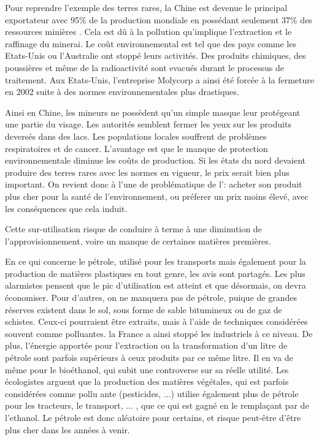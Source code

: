 Pour reprendre l'exemple des terres rares, la Chine est devenue le principal exportateur avec 95\% de la production mondiale en possédant seulement 37\% des ressources minières \cite{MongolieChine}. Cela est dû à la pollution qu'implique l'extraction et le raffinage du minerai. Le coût environnemental est tel que des pays comme les Etats-Unis ou l'Australie ont stoppé leurs activités. Des produits chimiques, des poussières et même de la radioactivité sont evacués durant le processus de traitement. Aux Etats-Unis, l'entreprise Molycorp a ainsi été forcée à la fermeture en 2002 suite à des normes environnementales plus drastiques.

Ainsi en Chine, les mineurs ne possèdent qu'un simple masque leur protégeant une partie du visage. Les autorités semblent fermer les yeux sur les produits deversés dans des lacs. Les populations locales souffrent de problèmes respiratoires et de cancer. L'avantage est que le manque de protection environnementale diminue les coûts de production. Si les états du nord devaient produire des terres rares avec les normes en vigueur, le prix serait bien plus important. On revient donc à l'une de problématique de l'\op : acheter son produit plus cher pour la santé de l'environnement, ou préferer un prix moins élevé, avec les conséquences que cela induit.


\smallbreak Cette sur-utilisation risque de conduire à terme à une diminution de l'approvisionnement, voire un manque de certaines matières premières.

En ce qui concerne le pétrole, utilisé pour les transports mais également pour la production de matières plastiques en tout genre, les avis sont partagés. Les plus alarmistes pensent que le pic d'utilisation est atteint et que désormais, on devra économiser. Pour d'autres, on ne manquera pas de pétrole, puique de grandes réserves existent dans le sol, sous forme de sable bitumineux ou de gaz de schistes. Ceux-ci pourraient être extraits, mais à l'aide de techniques considérées souvent comme polluantes. la France a ainsi stoppé les industriels à ce niveau. De plus, l'énergie apportée pour l'extraction ou la transformation d'un litre de pétrole sont parfois supérieurs à ceux produits par ce même litre. Il en va de même pour le bioéthanol, qui subit une controverse sur sa réelle utilité. Les écologistes arguent que la production des matières végétales, qui est parfois considérées comme pollu	ante (pesticides, ...) utilise également plus de pétrole pour les tracteurs, le transport, ... , que ce qui est gagné en le remplaçant par de l'ethanol. Le pétrole est donc aléatoire pour certains, et risque peut-être d'être plus cher dans les années à venir.


